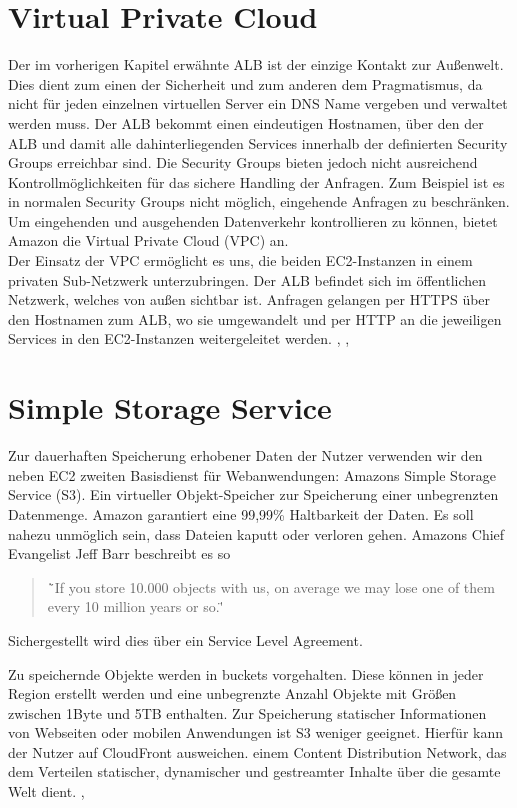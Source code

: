\section{Virtual Private Cloud}
\label{sec:vpc}
Der im vorherigen Kapitel erwähnte ALB ist der einzige Kontakt zur Außenwelt. Dies dient zum einen der Sicherheit und zum anderen dem Pragmatismus, da nicht für jeden einzelnen virtuellen Server ein DNS Name vergeben und verwaltet werden muss. Der ALB bekommt einen eindeutigen Hostnamen, über den der ALB und damit alle dahinterliegenden Services innerhalb der definierten Security Groups erreichbar sind. Die Security Groups bieten jedoch nicht ausreichend Kontrollmöglichkeiten für das sichere Handling der Anfragen. Zum Beispiel ist es in normalen Security Groups nicht möglich, eingehende Anfragen zu beschränken. Um eingehenden und ausgehenden Datenverkehr kontrollieren zu können, bietet Amazon die Virtual Private Cloud (VPC) an. \\
Der Einsatz der VPC ermöglicht es uns, die beiden EC2-Instanzen in einem privaten Sub-Netzwerk unterzubringen. Der ALB befindet sich im öffentlichen Netzwerk, welches von außen sichtbar ist. Anfragen gelangen per HTTPS über den Hostnamen zum ALB, wo sie umgewandelt und per HTTP an die jeweiligen Services in den EC2-Instanzen weitergeleitet werden.
\cite{vliet:resilience}, \cite{wittig:awsinaction}, \cite{aws:vpc}

\section{Simple Storage Service}
\label{sec:s3}
Zur dauerhaften Speicherung erhobener Daten der Nutzer verwenden wir den neben EC2 zweiten Basisdienst für Webanwendungen: Amazons Simple Storage Service (S3). Ein virtueller Objekt-Speicher zur Speicherung einer unbegrenzten Datenmenge. Amazon garantiert eine 99,99\% Haltbarkeit der Daten. Es soll nahezu unmöglich sein, dass Dateien kaputt oder verloren gehen. Amazons Chief Evangelist Jeff Barr beschreibt es so \\
\begin{quote}
\"`If you store 10.000 objects with us, on average we may lose one of them every 10 million years or so.\"'
\end{quote} \cite{vliet:programmingec2}

Sichergestellt wird dies über ein Service Level Agreement. \cite{vliet:programmingec2}

Zu speichernde Objekte werden in buckets vorgehalten. Diese können in jeder Region erstellt werden und eine unbegrenzte Anzahl Objekte mit Größen zwischen 1Byte und 5TB enthalten. Zur Speicherung statischer Informationen von Webseiten oder mobilen Anwendungen ist S3 weniger geeignet. Hierfür kann der Nutzer auf CloudFront ausweichen. einem Content Distribution Network, das dem Verteilen statischer, dynamischer und gestreamter Inhalte über die gesamte Welt dient.
\cite{vliet:resilience}, \cite{aws:s3}

